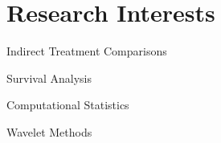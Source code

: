 \documentclass[letterpaper,11pt]{article}
\begin{document}
\section{Research Interests}
\begin{itemize}[leftmargin=0.15in, label={}]
    \small{\item{{Indirect Treatment Comparisons} \\
           \item {Survival Analysis} \\
           \item {Computational Statistics} \\
           \item {Wavelet Methods}}} \\
\end{itemize}


\end{document}
